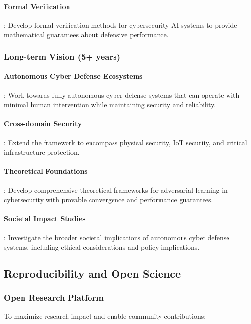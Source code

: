 \documentclass[12pt,oneside]{article}
\begin{document}
\paragraph{Formal Verification}: Develop formal verification methods for cybersecurity AI systems to provide mathematical guarantees about defensive performance.

\subsubsection{Long-term Vision (5+ years)}

\paragraph{Autonomous Cyber Defense Ecosystems}: Work towards fully autonomous cyber defense systems that can operate with minimal human intervention while maintaining security and reliability.

\paragraph{Cross-domain Security}: Extend the framework to encompass physical security, IoT security, and critical infrastructure protection.

\paragraph{Theoretical Foundations}: Develop comprehensive theoretical frameworks for adversarial learning in cybersecurity with provable convergence and performance guarantees.

\paragraph{Societal Impact Studies}: Investigate the broader societal implications of autonomous cyber defense systems, including ethical considerations and policy implications.

\subsection{Reproducibility and Open Science}

\subsubsection{Open Research Platform}
To maximize research impact and enable community contributions:
\end{document}
